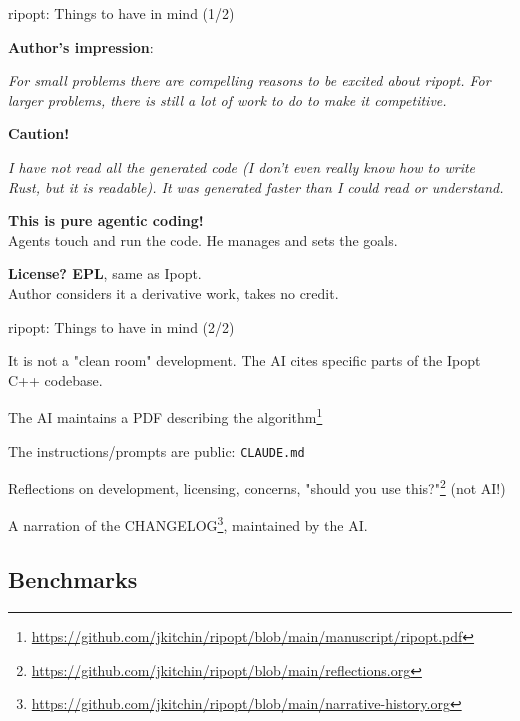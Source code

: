 \documentclass{beamer}
\begin{document}
\begin{frame}{ripopt: Things to have in mind (1/2)}

  \textbf{Author's impression}:

  \emph{For small problems there are compelling reasons to be excited about ripopt. For larger problems, there is still a lot of work to do to make it competitive.}

  \vfill

  \textbf{Caution!}

  \emph{I have not read all the generated code (I don't even really know how to write Rust, but it is readable). It was generated faster than I could read or understand. }

  \vfill

  \textbf{This is pure agentic coding!} \\
  Agents touch and run the code. He manages and sets the goals.

  \vfill

  \textbf{License? EPL}, same as Ipopt.\\
  Author considers it a derivative work, takes no credit.

\end{frame}

\begin{frame}{ripopt: Things to have in mind (2/2)}

  It is not a "clean room" development. The AI cites specific parts of the Ipopt C++ codebase.

  \vfill
  The AI maintains a  PDF describing the algorithm\footnote{\tiny \url{https://github.com/jkitchin/ripopt/blob/main/manuscript/ripopt.pdf}}

  \vfill
  The instructions/prompts are public: \texttt{CLAUDE.md}

  \vfill
  Reflections on development, licensing, concerns, "should you use this?"\footnote{\tiny \url{https://github.com/jkitchin/ripopt/blob/main/reflections.org}} (not AI!)

  \vfill
  A narration of the CHANGELOG\footnote{\tiny \url{https://github.com/jkitchin/ripopt/blob/main/narrative-history.org}}, maintained by the AI.

\end{frame}

\subsection{Benchmarks}
\end{document}
